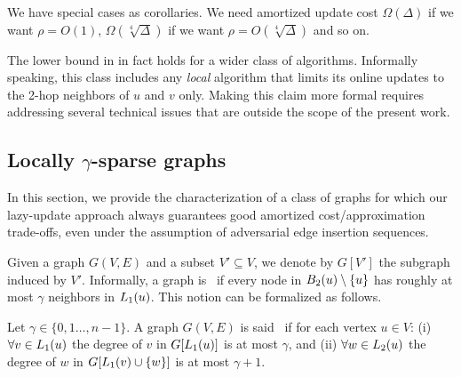 We have special cases as corollaries. We need amortized update cost $\Omega(\Delta)$ if we want $\rho = O(1)$, $\Omega(\sqrt[4]{\Delta})$ if we want $\rho = O(\sqrt[4]{\Delta})$ and so on. 

\begin{remark}
    The lower bound in  in fact holds for a wider class of algorithms. Informally speaking, this class includes any \textit{local} algorithm that limits its online updates to the 2-hop neighbors of $u$ and $v$ only. Making this claim more formal requires addressing several technical issues that are outside the scope of the present work. 
\end{remark}

\subsection{Locally \texorpdfstring{$\gamma$}{gamma}-sparse graphs} \label{ssec:gammaok}

In this section, we provide the characterization of a class of graphs for which our lazy-update approach always guarantees good amortized cost/approximation trade-offs, even under the assumption of adversarial edge insertion sequences.

Given a graph $G(V,E)$ and a subset $V' \subseteq V$, we denote by $G[V']$ the subgraph induced by $V'$. 
Informally, a graph is \gammaok\ if every node in $B_2(u) \setminus \{u\}$ has roughly at most $\gamma$ neighbors in $L_1(u)$. This notion can be formalized as follows. 


 

\begin{definition} \label{def:gammaok}
 Let  $\gamma \in 
 \{ 0,1\ldots , n-1\}$. A graph $G(V,E)$ is said \gammaok\ if for each vertex $u \in V$:
    (i) $\forall v \in L_1(u)$ the degree of $v$ in $G[L_1(u)]$ is at most $\gamma$, and (ii) $\forall w \in L_2(u)$ the degree of $w$ in $G[L_1(v) \cup \{ w \}]$ is at most $\gamma+1$.
\end{definition}

